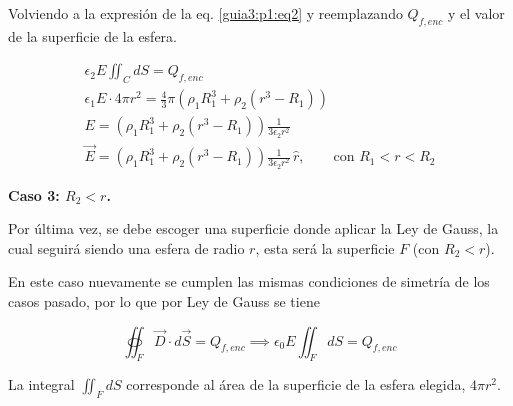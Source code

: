\documentclass[11pt]{article}
\begin{document}
\begin{solucion}
    Volviendo a la expresión de la eq. \ref{guia3:p1:eq2} y reemplazando $Q_{f, enc}$ y el valor de la superficie de la esfera.

    \begin{gather}
        \epsilon_2E \iint_C dS = Q_{f, enc}
        \\
        \epsilon_1E \cdot 4\pi r^2 = \frac{4}{3}\pi \left(\rho_1  R_1^3 + \rho_2 (r^3 - R_1)\right)
        \\
        E = \left(\rho_1  R_1^3 + \rho_2 (r^3 - R_1)\right)\frac{1}{3\epsilon_2 r^2}
        \\
        \vec{E} = \left(\rho_1  R_1^3 + \rho_2 (r^3 - R_1)\right)\frac{1}{3\epsilon_2 r^2} \, \hat{r},\qquad \text{con }R_1<r<R_2
    \end{gather}

    {\bfseries \large Caso 3: $R_2<r$.}

    Por última vez, se debe escoger una superficie donde aplicar la Ley de Gauss, la cual seguirá siendo una esfera de radio $r$, esta será la superficie $F$ (con $R_2<r$).

    \begin{figure}[H]
        \centering
    \end{figure}

    En este caso nuevamente se cumplen las mismas condiciones de simetría de los casos pasado, por lo que por Ley de Gauss se tiene

    \begin{equation}
        \oiint_F \vec{D} \cdot d\vec{S} = Q_{f, enc} \implies \epsilon_0E \iint_F dS = Q_{f, enc} \label{guia3:p1:eq3}
    \end{equation}

    La integral $\iint_F dS$ corresponde al área de la superficie de la esfera elegida, $4\pi r^2$.


\end{solucion}
\end{document}
